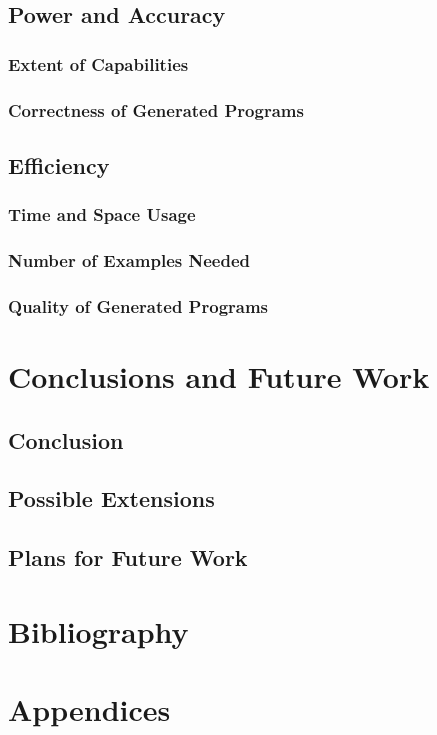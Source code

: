 \documentclass[a4paper,twoside,notitlepage]{article}
\begin{document}
\subsection{Power and Accuracy}
\subsubsection{Extent of Capabilities}
\subsubsection{Correctness of Generated Programs}
\subsection{Efficiency}
\subsubsection{Time and Space Usage}
\subsubsection{Number of Examples Needed}
\subsubsection{Quality of Generated Programs}

\section{Conclusions and Future Work}
\subsection{Conclusion}
\subsection{Possible Extensions}
\subsection{Plans for Future Work}

\section{Bibliography}

\section{Appendices}
\end{document}
